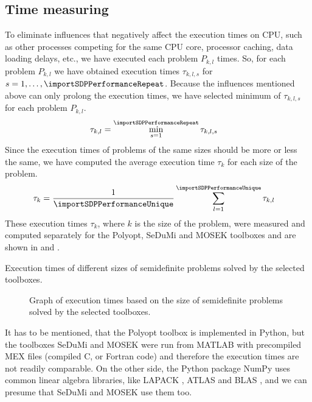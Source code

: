 \subsection{Time measuring}
To eliminate influences that negatively affect the execution times on CPU, such as other processes competing for the same CPU core, processor caching, data loading delays, etc., we have executed each problem $P_{k,l}$ \importSDPPerformanceRepeat{} times.
So, for each problem $P_{k,l}$ we have obtained execution times $\tau_{k,l,s}$ for $s = 1,\ldots,\importSDPPerformanceRepeat$.
Because the influences mentioned above can only prolong the execution times, we have selected minimum of $\tau_{k,l,s}$ for each problem $P_{k,l}$.
\begin{align}
  \tau_{k,l} &= \min_{s=1}^{\importSDPPerformanceRepeat} \tau_{k,l,s}
\end{align}
Since the execution times of problems of the same sizes should be more or less the same, we have computed the average execution time $\tau_k$ for each size of the problem.
\begin{align}
  \tau_k &= \frac{1}{\importSDPPerformanceUnique}\sum_{l=1}^{\importSDPPerformanceUnique} \tau_{k,l}
\end{align}
These execution times $\tau_k$, where $k$ is the size of the problem, were measured and computed separately for the Polyopt, SeDuMi and MOSEK toolboxes and are shown in  and .

\begin{table}[ht]
  \centering
  
  \caption{Execution times of different sizes of semidefinite problems solved by the selected toolboxes.}
\end{table}

\begin{figure}[ht]
  \centering
  \resizebox{0.95\textwidth}{!}{}
  \caption{Graph of execution times based on the size of semidefinite problems solved by the selected toolboxes.}
\end{figure}

It has to be mentioned, that the Polyopt toolbox is implemented in Python, but the toolboxes SeDuMi and MOSEK were run from MATLAB with precompiled MEX files (compiled C, \CC{} or Fortran code) and therefore the execution times are not readily comparable.
On the other side, the Python package NumPy uses common linear algebra libraries, like LAPACK \cite{lapack}, ATLAS \cite{atlas} and BLAS \cite{blas}, and we can presume that SeDuMi and MOSEK use them too.

